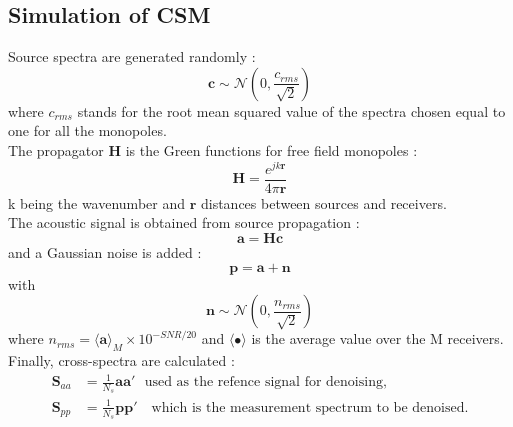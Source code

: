 \documentclass[fontsize=12pt,DIV13,paper=a4,abstract=true,titlepage=false]{scrartcl}
\newcommand{\bo}[1]{ \mathbf{#1} }
\begin{document}
\subsection{Simulation of CSM}
Source spectra are generated randomly  :
\begin{equation}
	\bo{c}\sim \mathcal{N}(0,\frac{c_{rms}}{\sqrt{2}})
\end{equation}
where $c_{rms}$ stands for the root mean squared value of the spectra chosen equal to one for all the monopoles.\\

The propagator $\bo{H}$ is the Green functions for free field monopoles : 
\begin{equation}
	\bo{H}=\frac{e^{j k \bo{r}}}{4 \pi \bo{r}}
\end{equation}
k being the wavenumber and $\bo{r}$ distances between sources and receivers.\\

The acoustic signal is obtained from source propagation : \\
\begin{equation}
    \bo{a} = \bo{Hc}
\end{equation}
and a Gaussian noise is added : 
\begin{equation}
    \bo{p} = \bo{a} + \bo{n}
\end{equation}
with
\begin{equation}
    \bo{n}\sim \mathcal{N}(0,\frac{n_{rms}}{\sqrt{2}})
    \label{noise}
\end{equation}
where $n_{rms}=\langle \bo{a} \rangle_M \times 10^{-SNR/20}$ and $\langle \bullet \rangle$ is the average value over the M receivers.\\

Finally, cross-spectra are calculated : 
\begin{align}
\bo{S}_{aa} &= \frac{1}{N_s}\bo{aa'}~~~\text{used as the refence signal for denoising,}\\
\bo{S}_{pp} &= \frac{1}{N_s}\bo{pp'}~~~\text{ which is the measurement spectrum to be denoised.}
\end{align}
\end{document}
